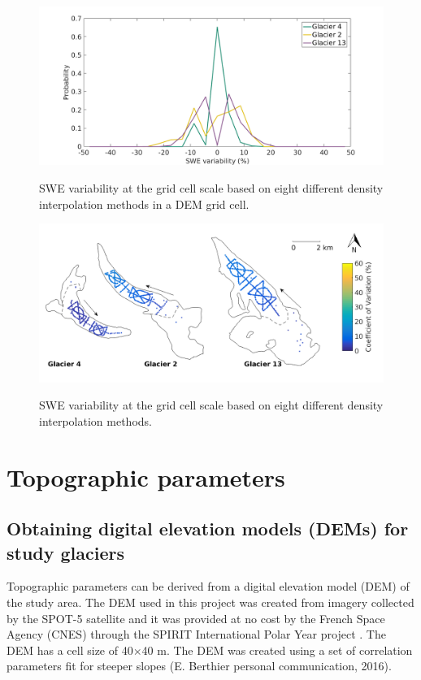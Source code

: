 \documentclass{sfuthesis}
\begin{document}
\begin{figure}[H]
	\centering
	\includegraphics[width =\textwidth]{SWEvarDensityHIST.png}\\
	\caption{SWE variability at the grid cell scale based on eight different density interpolation methods in a DEM grid cell.}
	\label{fig:SWEvar_Density_hist}
\end{figure}

\begin{figure}[H]
	\centering
	\includegraphics[width =\textwidth]{Map_cellstd_density.png}\\
	\caption{SWE variability at the grid cell scale based on eight different density interpolation methods.}
	\label{fig:SWEvar_Density_map}
\end{figure}

\section{Topographic parameters}

\subsection{Obtaining digital elevation models (DEMs) for study glaciers}

Topographic parameters can be derived from a digital elevation model (DEM) of the study area. The DEM used in this project was created from imagery collected by the SPOT-5 satellite and it was provided at no cost by the French Space Agency (CNES) through the SPIRIT International Polar Year project \citep{Korona2009}. The DEM has a cell size of 40$\times$40 m. The DEM was created using a set of correlation parameters fit for steeper slopes (E. Berthier personal communication, 2016). 
\end{document}

